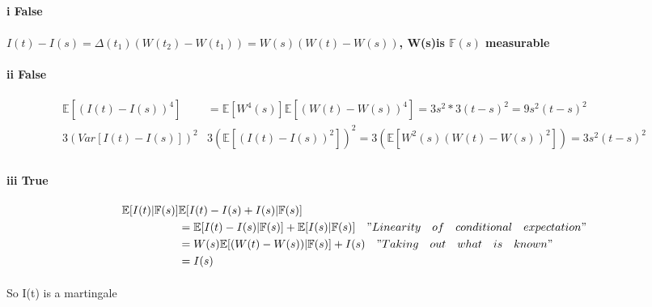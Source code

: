 \documentclass{article}
\begin{document}
\paragraph{i False}
\paragraph{ $I(t)-I(s)= \Delta(t_1)(W(t_2)-W(t_1))=W(s)(W(t)-W(s))$, W(s)is $\mathbb{F}(s)$ measurable}
\paragraph{ii False}
\begin{align*}
  \mathbb{E}[(I(t)-I(s))^4] & = \mathbb{E}[W^4(s)]\mathbb{E}[(W(t)-W(s))^4]=3s^2*3(t-s)^2=9s^2(t-s)^2\\
  3(Var[I(t)-I(s)])^2 & 3(\mathbb{E}[(I(t)-I(s))^2])^2=3(\mathbb{E}[W^2(s)(W(t)-W(s))^2])=3s^2(t-s)^2 \\
\end{align*}
\paragraph{iii True}
\begin{align*}
  \mathbb{E}[I(t)|\mathbb{F}(s)] & \mathbb{E}[I(t)-I(s)+I(s)|\mathbb{F}(s)] \\
   & =\mathbb{E}[I(t)-I(s)|\mathbb{F}(s)]+\mathbb{E}[I(s)|\mathbb{F}(s)] \quad "Linearity\quad of\quad conditional \quad expectation"\\
   & =W(s)\mathbb{E}[(W(t)-W(s))|\mathbb{F}(s)]+I(s)\quad "Taking\quad out\quad what\quad is\quad known"\\
   &= I(s)
\end{align*}
\paragraph{}{So I(t) is a martingale}
\end{document}
